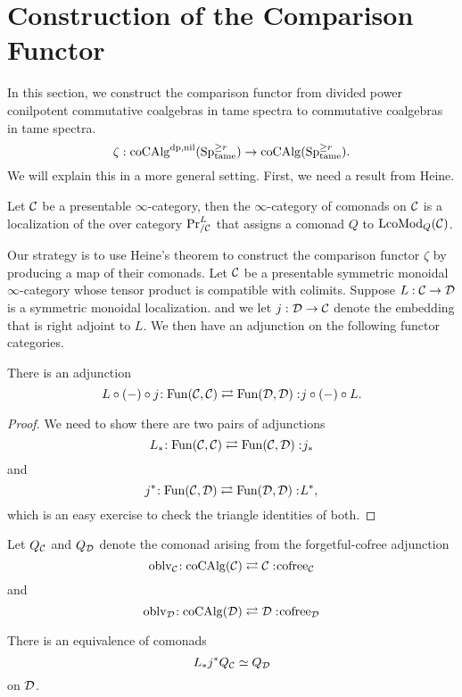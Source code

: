 \section{Construction of the Comparison Functor}
\label{Construction of the Comparison Functor}
In this section, we construct the comparison functor from divided power conilpotent commutative coalgebras in tame spectra to commutative coalgebras in tame spectra.
$$
\zeta:\operatorname{coCAlg}^{\operatorname{dp},\operatorname{nil}}(\operatorname{Sp}^{\geq r}_{\operatorname{\operatorname{tame}}}) \to
\operatorname{coCAlg}(\operatorname{Sp}^{\geq r}_{\operatorname{\operatorname{tame}}}).
$$
We will explain this in a more general setting.
First, we need a result from Heine.
\begin{theorem}
\label{Monads-Alg correspondence}
\cite[Theorem 5.1]{Heine_Monads}
Let ${\mathcal{C}}$ be a presentable $\infty$-category, then the $\infty$-category of comonads on ${\mathcal{C}}$ is a localization of the over category $\Pr^{L}_{/{\mathcal{C}}}$ that assigns a comonad $Q$ to $\operatorname{LcoMod}_{Q}({\mathcal{C}})$.
\end{theorem}

Our strategy is to use Heine's theorem to construct the comparison functor $\zeta$ by producing a map of their comonads.
Let ${\mathcal{C}}$ be a presentable symmetric monoidal $\infty$-category whose tensor product is compatible with colimits.
Suppose $L:{\mathcal{C}} \to {\mathcal{D}}$ is a symmetric monoidal localization.
and we let $j:{\mathcal{D}} \to {\mathcal{C}}$ denote the embedding that is right adjoint to $L$.
We then have an adjunction on the following functor categories.
\begin{proposition}
\label{Prop A.4.2}
There is an adjunction
$$
    L\circ (-)\circ j\negmedspace: \operatorname{Fun}({\mathcal{C}}, {\mathcal{C}})\rightleftarrows \operatorname{Fun}({\mathcal{D}}, {\mathcal{D}}):\negmedspace j\circ (-)\circ L.
$$
\end{proposition}
\begin{proof}
    We need to show there are two pairs of adjunctions
    $$
    L_{*}\negmedspace: \operatorname{Fun}({\mathcal{C}}, {\mathcal{C}})\rightleftarrows \operatorname{Fun}({\mathcal{C}}, {\mathcal{D}}):\negmedspace j_*
    $$
    and
    $$
    j^{*}\negmedspace: \operatorname{Fun}({\mathcal{C}}, {\mathcal{D}})\rightleftarrows \operatorname{Fun}({\mathcal{D}}, {\mathcal{D}}):\negmedspace L^*,
    $$
    which is an easy exercise to check the triangle identities of both.
\end{proof}
Let $Q_{{\mathcal{C}}}$ and $Q_{{\mathcal{D}}}$ denote the comonad arising from the forgetful-cofree adjunction 
$$\operatorname{oblv}_{{\mathcal{C}}}\negmedspace: \operatorname{coCAlg}({\mathcal{C}})\rightleftarrows {\mathcal{C}}:\negmedspace \operatorname{cofree}_{{\mathcal{C}}}$$
and
$$\operatorname{oblv}_{{\mathcal{D}}}\negmedspace: \operatorname{coCAlg}({\mathcal{D}})\rightleftarrows {\mathcal{D}}:\negmedspace \operatorname{cofree}_{{\mathcal{D}}}$$
\begin{lemma}
    There is an equivalence of comonads
    $$
    L_* j^*Q_{{\mathcal{C}}}\simeq Q_{{\mathcal{D}}}
    $$
    on ${\mathcal{D}}$.
\end{lemma}



